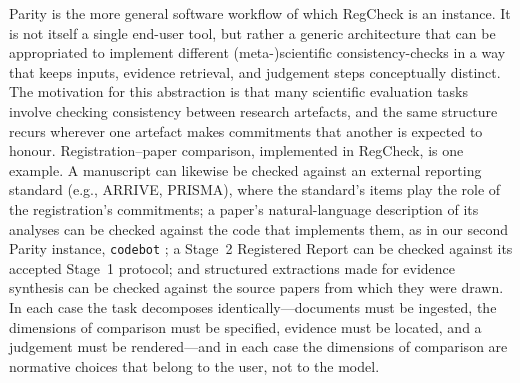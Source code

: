\documentclass{article}
\begin{document}
Parity is the more general software workflow of which RegCheck is an instance.
It is not itself a single end-user tool, but rather a generic architecture that
can be appropriated to implement different (meta-)scientific consistency-checks
in a way that keeps inputs, evidence retrieval, and judgement steps conceptually
distinct.
The motivation for this abstraction is that many scientific evaluation tasks
involve checking consistency between research artefacts, and the same structure
recurs wherever one artefact makes commitments that another is expected to
honour. Registration--paper comparison, implemented in RegCheck, is one example.
A manuscript can likewise be checked against an external reporting standard
(e.g., ARRIVE, PRISMA), where the standard's items play the role of the
registration's commitments; a paper's natural-language description of its
analyses can be checked against the code that implements them, as in our second
Parity instance, \texttt{codebot} \citep{cummins_codebot_2026}; a Stage~2
Registered Report can be checked against its accepted Stage~1 protocol; and
structured extractions made for evidence synthesis can be checked against the
source papers from which they were drawn. In each case the task decomposes
identically---documents must be ingested, the dimensions of comparison must be
specified, evidence must be located, and a judgement must be rendered---and in
each case the dimensions of comparison are normative choices that belong to the
user, not to the model.
\end{document}
